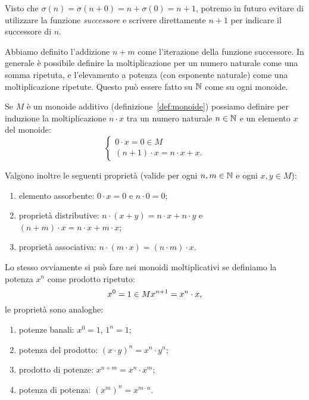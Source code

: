 %
Visto che $\sigma(n) = \sigma(n+0) = n+\sigma(0) = n+1$, 
potremo in futuro evitare di utilizzare la funzione \emph{successore} 
e scrivere direttamente $n+1$ per indicare il successore di $n$.

Abbiamo definito l'addizione $n+m$ 
come l'iterazione della funzione successore.
In generale è possibile definire la moltiplicazione per un numero naturale 
come una somma ripetuta, e l'elevamento a potenza (con esponente naturale)
come una moltiplicazione ripetute. 
Questo può essere fatto su ${\mathbb N}$ come su ogni monoide.

\begin{theorem}
\label{th:operazioni_iterate}%
\label{th:operazione_ripetuta}%
Se $M$ è un monoide additivo (definizione~\ref{def:monoide})
possiamo definire per induzione la moltiplicazione $n\cdot x$ tra un numero 
naturale $n\in {\mathbb N}$ e un elemento $x$ del monoide:
\[
\begin{cases}
  0\cdot x = 0 \in M \\
  (n+1)\cdot x = n\cdot x + x.
\end{cases}
\]

Valgono inoltre le seguenti proprietà
(valide per ogni $n,m\in {\mathbb N}$ e ogni $x,y\in M$):
\begin{enumerate}
  \item elemento assorbente: $0\cdot x = 0$ e $n\cdot 0 = 0$;
  \item proprietà distributive: 
    $n\cdot (x+y)=n\cdot x + n\cdot y$
    e $(n+m)\cdot x = n\cdot x + m\cdot x$;
  \item proprietà associativa: $n\cdot (m\cdot x)= (n\cdot m)\cdot x$.
\end{enumerate}

Lo stesso ovviamente si può fare nei monoidi moltiplicativi
se definiamo la potenza $x^n$ come prodotto ripetuto:
\[
  x^0 = 1 \in M \\
  x^{n+1} = x^n \cdot x,
\]
le proprietà sono analoghe:
\begin{enumerate}
  \item potenze banali: $x^0=1$, $1^n=1$;
  \item potenza del prodotto: $(x\cdot y)^n = x^n\cdot y^n$;
  \item prodotto di potenze: $x^{n+m}=x^n\cdot x^m$;
  \item potenza di potenza: $(x^m)^n = x^{m\cdot n}$.
\end{enumerate}
\end{theorem}
